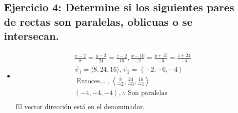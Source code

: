 \subsection{Ejercicio 4: Determine si los siguientes pares de rectas son paralelas, oblicuas o se intersecan.}
\begin{itemize}
    \item \begin{align*}
        \frac{x-2}{8} = \frac{y-3}{24} = \frac{z-2}{16} , \frac{x-10}{-2} = \frac{y+15}{-6} = \frac{z+24}{-4} \\ 
        \vec{v}_1 = \langle 8,24,16 \rangle, \vec{v}_2  = \left\langle -2,-6,-4 \right\rangle \\ 
        \text{  Entoces...  }, \left\langle \frac{8}{-2}, \frac{24}{-6} , \frac{16}{-4}   \right\rangle  \\ 
        \left\langle -4,-4,-4   \right\rangle, \therefore \text{  Son paralelas  } \\   
    \end{align*}
    El vector dirección está en el denominador.
    

\end{itemize}
